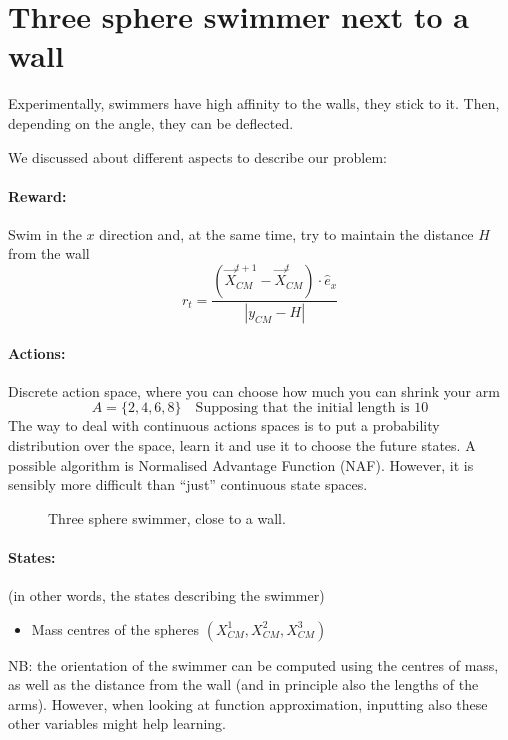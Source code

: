\documentclass{article}
\begin{document}
\section{Three sphere swimmer next to a wall}
Experimentally, swimmers have high affinity to the walls, they stick to it. Then, depending on the angle, they can be deflected.

We discussed about different aspects to describe our problem:

\paragraph{Reward:} Swim in the $x$ direction and, at the same time, try to maintain the distance $H$ from the wall
\[
r_t=\frac{(\vec{X}_{CM}^{t+1}-\vec{X}_{CM}^t)\cdot \hat{e}_x}{|y_{CM}-H|}
\]
\paragraph{Actions:} Discrete action space, where you can choose how much you can shrink your arm
\[
A = \{2,4,6,8\} \quad\text{Supposing that the initial length is 10}
\]
The way to deal with continuous actions spaces is to put a probability distribution over the space, learn it and use it to choose the future states. A possible algorithm is Normalised Advantage Function (NAF). However, it is sensibly more difficult than ``just'' continuous state spaces.
\begin{figure}
	\centering
	\caption{Three sphere swimmer, close to a wall.}
\end{figure}
\paragraph{States:} (in other words, the states describing the swimmer)
\begin{itemize}
	\item Mass centres of the spheres $(X_{CM}^1,X_{CM}^2,X_{CM}^3)$
\end{itemize}
NB: the orientation of the swimmer can be computed using the centres of mass, as well as the distance from the wall (and in principle also the lengths of the arms). However, when looking at function approximation, inputting also these other variables might help learning.
\\
\end{document}
